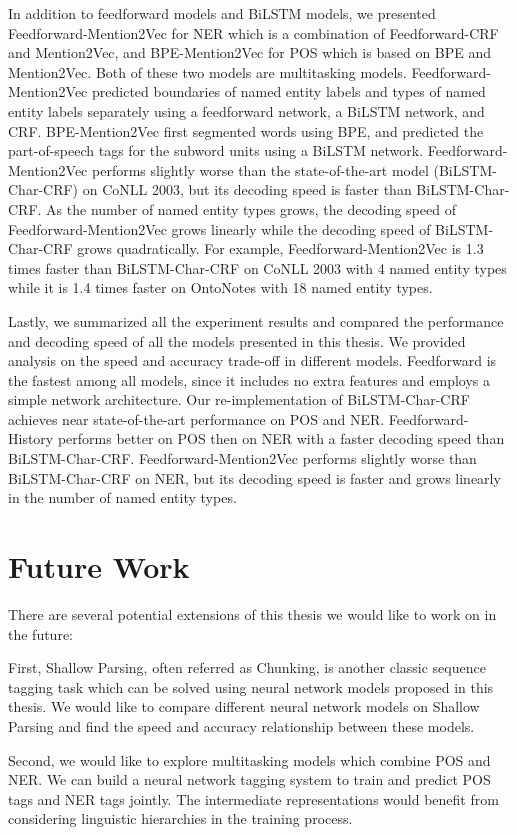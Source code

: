 \documentclass{sfuthesis}
\begin{document}
In addition to feedforward models and BiLSTM models, we presented Feedforward-Mention2Vec for NER which is a combination of Feedforward-CRF and Mention2Vec, and BPE-Mention2Vec for POS which is based on BPE and Mention2Vec. Both of these two models are multitasking models. Feedforward-Mention2Vec predicted boundaries of named entity labels and types of named entity labels separately using a feedforward network, a BiLSTM network, and CRF. BPE-Mention2Vec first segmented words using BPE, and predicted the part-of-speech tags for the subword units using a BiLSTM network. Feedforward-Mention2Vec performs slightly worse than the state-of-the-art model (BiLSTM-Char-CRF) on CoNLL 2003, but its decoding speed is faster than BiLSTM-Char-CRF. As the number of named entity types grows, the decoding speed of Feedforward-Mention2Vec grows linearly while the decoding speed of BiLSTM-Char-CRF grows quadratically. For example, Feedforward-Mention2Vec is 1.3 times faster than BiLSTM-Char-CRF on CoNLL 2003 with 4 named entity types while it is 1.4 times faster on OntoNotes with 18 named entity types.

Lastly, we summarized all the experiment results and compared the performance and decoding speed of all the models presented in this thesis. We provided analysis on the speed and accuracy trade-off in different models. Feedforward is the fastest among all models, since it includes no extra features and employs a simple network architecture. Our re-implementation of BiLSTM-Char-CRF achieves near state-of-the-art performance on POS and NER. Feedforward-History performs better on POS then on NER with a faster decoding speed than BiLSTM-Char-CRF. Feedforward-Mention2Vec performs slightly worse than BiLSTM-Char-CRF on NER, but its decoding speed is faster and grows linearly in the number of named entity types.

\section{Future Work}
There are several potential extensions of this thesis we would like to work on in the future:

First, Shallow Parsing, often referred as Chunking, is another classic sequence tagging task which can be solved using neural network models proposed in this thesis. We would like to compare different neural network models on Shallow Parsing and find the speed and accuracy relationship between these models.

Second, we would like to explore multitasking models which combine POS and NER. We can build a neural network tagging system to train and predict POS tags and NER tags jointly. The intermediate representations would benefit from considering linguistic hierarchies in the training process.
\end{document}
